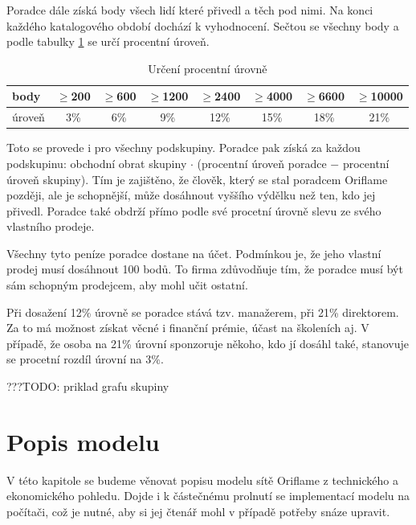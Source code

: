 \documentclass[a4wide,12pt]{report}
\begin{document}
Poradce dále získá body všech lidí které přivedl a těch pod nimi. Na konci každého katalogového období dochází k vyhodnocení. Sečtou se všechny body a podle tabulky \ref{tab:perc_level} se určí procentní úroveň.
\begin{table}[h]
\begin{center}
\begin{tabular}{|l|c|c|c|c|c|c|c|}
\hline
body & $\geq$200 & $\geq$600 & $\geq$1200 & $\geq$2400 & $\geq$4000 & $\geq$6600& $\geq$10000\\\hline
úroveň & 3\% & 6\% & 9\% & 12\% & 15\% & 18\% & 21\%\\\hline
\end{tabular}
\end{center}
\caption{Určení procentní úrovně}
\label{tab:perc_level}
\end{table}
Toto se provede i pro všechny podskupiny. Poradce pak získá za každou podskupinu: obchodní obrat skupiny $\cdot$ (procentní úroveň poradce $-$ procentní úroveň skupiny). Tím je zajištěno, že člověk, který se stal poradcem Oriflame později, ale je schopnější, může dosáhnout vyššího výdělku než ten, kdo jej přivedl. Poradce také obdrží přímo podle své procetní úrovně slevu ze svého vlastního prodeje.

Všechny tyto peníze poradce dostane na účet. Podmínkou je, že jeho vlastní prodej musí dosáhnout 100 bodů. To firma zdůvodňuje tím, že poradce musí být sám schopným prodejcem, aby mohl učit ostatní.

Při dosažení 12\% úrovně se poradce stává tzv. manažerem, při 21\% direktorem. Za to má možnost získat věcné i finanční prémie, účast na školeních aj. V případě, že osoba na 21\% úrovní sponzoruje někoho, kdo jí dosáhl také, stanovuje se procetní rozdíl úrovní na 3\%.

\bigskip ???TODO: priklad grafu skupiny


\chapter{Popis modelu}
V této kapitole se budeme věnovat popisu modelu sítě Oriflame z technického a ekonomického pohledu. Dojde i k částečnému prolnutí se implementací modelu na počítači, což je nutné, aby si jej čtenář mohl v případě potřeby snáze upravit.
\end{document}
